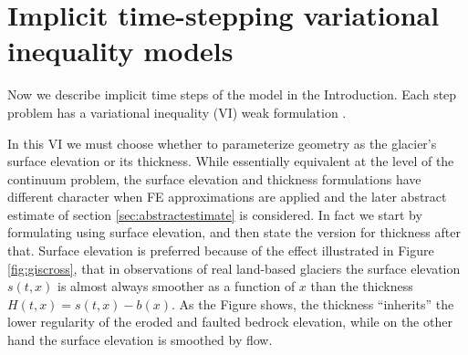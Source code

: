 \documentclass[hidelinks,onefignum,onetabnum,final]{siamart220329}  %
\begin{document}
\section{Implicit time-stepping variational inequality models} \label{sec:models}

Now we describe implicit time steps of the model in the Introduction.  Each step problem has a variational inequality (VI) weak formulation \cite{Evans2010,KinderlehrerStampacchia1980}.

In this VI we must choose whether to parameterize geometry as the glacier's surface elevation or its thickness.  While essentially equivalent at the level of the continuum problem, the surface elevation and thickness formulations have different character when FE approximations are applied and the later abstract estimate of section \ref{sec:abstractestimate} is considered.  In fact we start by formulating using surface elevation, and then state the version for thickness after that.  Surface elevation is preferred because of the effect illustrated in Figure \ref{fig:giscross}, that in observations of real land-based glaciers the surface elevation $s(t,x)$ is almost always smoother as a function of $x$ than the thickness $H(t,x) = s(t,x)-b(x)$.  As the Figure shows, the thickness ``inherits'' the lower regularity of the eroded and faulted bedrock elevation, while on the other hand the surface elevation is smoothed by flow.
\end{document}
